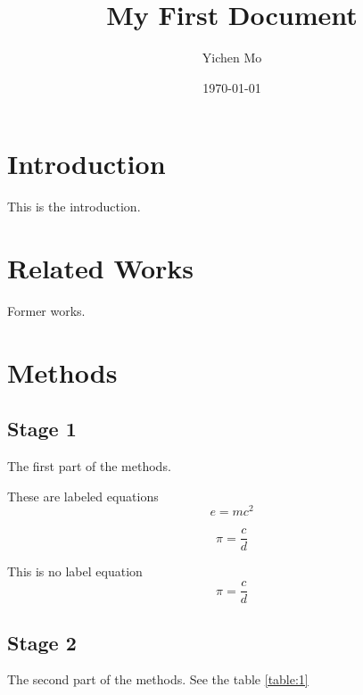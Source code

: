 \documentclass[a4paper,12pt]{article}
\begin{document}
\title{My First Document}
\author{Yichen Mo}
\date{\today}
\maketitle

\tableofcontents
\newpage
{} %


\section{Introduction}
This is the introduction.

\section{Related Works}
Former works.\cite{Birdetal2001}

\section{Methods}

\subsection{Stage 1}
The first part of the methods.


These are labeled equations
\begin{equation}
    e = mc^2
\end{equation}

\begin{equation}
    \pi = \frac{c}{d}
\end{equation}

This is no label equation
\begin{equation*}
    \pi = \frac{c}{d}
\end{equation*}

\subsection{Stage 2}
The second part of the methods. See the table \ref{table:1}
\end{document}
